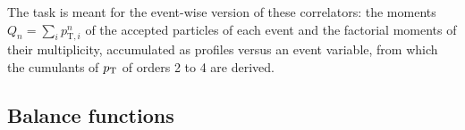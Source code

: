 The task  is meant for the event-wise version of these correlators: the moments
$Q_n=\sum_i p_{\mathrm{T},i}^n$ of the accepted particles of each event and the factorial moments of their multiplicity,
accumulated as profiles versus an event variable, from which the cumulants of $p_{\mathrm{T}}$ of orders 2 to 4 are derived.

\subsection{Balance functions}
\label{sec:bf}

